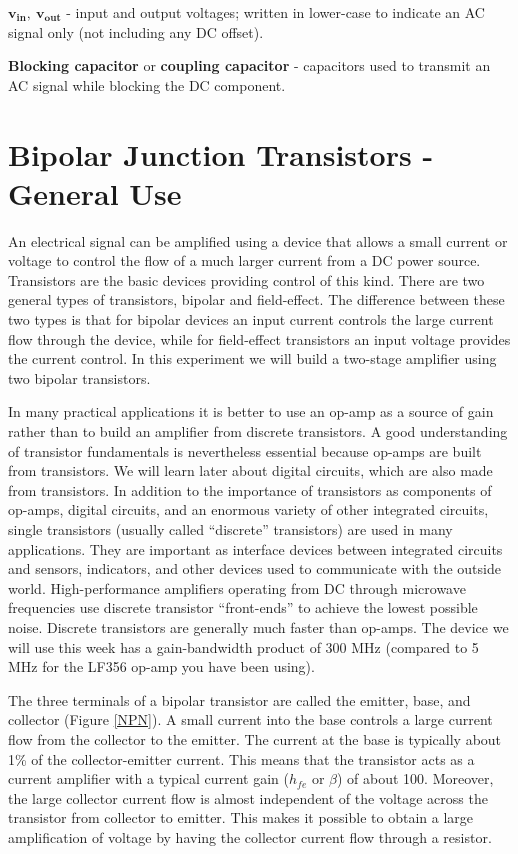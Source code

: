 \documentclass[10pt]{PhysLab1C} %
\begin{document}
$\mathbf{v_{in},~v_{out}}$ - input and output voltages; written in lower-case to indicate an AC signal only (not including any DC
offset).

\textbf{Blocking capacitor} or \textbf{coupling capacitor} - capacitors used to transmit an AC signal while blocking the DC
component.



\section{Bipolar Junction Transistors - General Use}

An electrical signal can be amplified using a device that allows a small current or voltage to control the flow of
a much larger current from a DC power source. Transistors are the basic devices providing control of this kind.
There are two general types of transistors, bipolar and field-effect. The difference between these two types is
that for bipolar devices an input current controls the large current flow through the device, while for field-effect transistors an input voltage provides the current control. In this experiment we will build a two-stage
amplifier using two bipolar transistors.

In many practical applications it is better to use an op-amp as a source of gain rather than to build an amplifier
from discrete transistors. A good understanding of transistor fundamentals is nevertheless essential because
op-amps are built from transistors. We will learn later about digital circuits, which are also made from
transistors. In addition to the importance of transistors as components of op-amps, digital circuits, and an
enormous variety of other integrated circuits, single transistors (usually called “discrete” transistors) are used
in many applications. They are important as interface devices between integrated circuits and sensors,
indicators, and other devices used to communicate with the outside world. High-performance amplifiers
operating from DC through microwave frequencies use discrete transistor “front-ends” to achieve the lowest
possible noise. Discrete transistors are generally much faster than op-amps. The device we will use this week
has a gain-bandwidth product of 300 MHz (compared to 5 MHz for the LF356 op-amp you have been using).

The three terminals of a bipolar transistor are called the emitter, base, and collector (Figure \ref{NPN}). A small current
into the base controls a large current flow from the collector to the emitter. The current at the base is typically
about 1\% of the collector-emitter current. This means that the transistor acts as a current amplifier with a typical current gain ($h_{fe}$ or $\beta$) of about 100. Moreover, the large collector current flow is almost independent of the
voltage across the transistor from collector to emitter. This makes it possible to obtain a large amplification of
voltage by having the collector current flow through a resistor.
\end{document}
